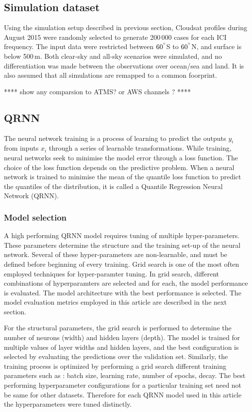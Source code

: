 \documentclass[amt, manuscript]{copernicus}
\begin{document}
\subsection{Simulation dataset}
%
Using the simulation setup described in previous section, Cloudsat profiles during August 2015 were randomly selected to generate 200\,000 cases for each ICI frequency. The input data were restricted between $60^{^{\circ}}$S to $60^{^{\circ}}$N, and surface is below 500\,m. Both clear-sky and all-sky scenarios were simulated, and no differentiation was made between the observations over ocean/sea and land. It is also assumed that all simulations are remapped to a common foorprint. 

**** show any comparsion to ATMS? or AWS channels ? ****

\subsection{QRNN}
%
The neural network training is a process of learning to predict the outputs {$y_i$} from inputs {$x_i$} through a series of learnable transformations. While training, neural networks seek to minimise the model error through a loss function. The choice of the loss function depends on the predictive problem. When a neural network is trained to minimise the mean of the quantile loss function to predict the quantiles of the distribution, it is called a Quantile Regression Neural Network (QRNN). 

 
\subsubsection{Model selection}
%
\label{model_selection}
A high performing QRNN model requires tuning of multiple hyper-parameters. These parameters determine the structure and the training set-up of the neural network. Several of these hyper-parameters are non-learnable, and must be defined before beginning of every training. Grid search is one of the most often employed techniques for hyper-paramter tuning. In grid search, different combinations of hyperparamters are selected and for each, the model performance is evaluated. The model architecture with the best performance is selected. The model evaluation metrics employed in this article are described in the next section. 

For the structural parameters, the grid search is performed to determine the number of neurons (width) and hidden layers (depth). The model is trained for multiple values of layer widths and hidden layers, and the best configuration is selected by evaluating the predictions over the validation set. Similarly, the training process is optimized by performing a grid search different training parameters such as : batch size, learning rate, number of epochs, decay. The best performing hyperparameter configurations for a particular training set need not be same for other datasets. Therefore for each QRNN model used in this article the hyperparameters were tuned distinctly. 
\end{document}

